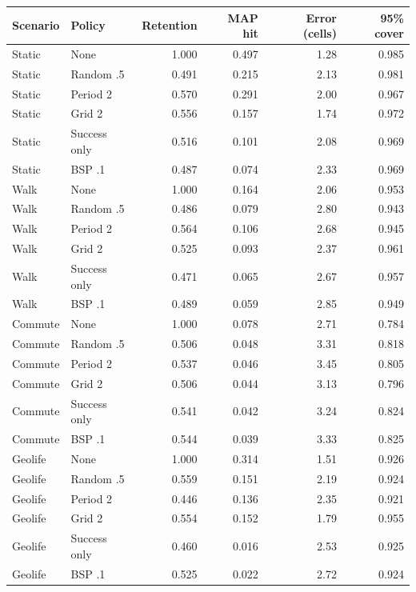 \begin{tabular}{llrrrr}
\toprule
Scenario & Policy & Retention & MAP hit & Error (cells) & 95\% cover \\
\midrule
Static & None & 1.000 & 0.497 & 1.28 & 0.985 \\
Static & Random .5 & 0.491 & 0.215 & 2.13 & 0.981 \\
Static & Period 2 & 0.570 & 0.291 & 2.00 & 0.967 \\
Static & Grid 2 & 0.556 & 0.157 & 1.74 & 0.972 \\
Static & Success only & 0.516 & 0.101 & 2.08 & 0.969 \\
Static & BSP .1 & 0.487 & 0.074 & 2.33 & 0.969 \\
\addlinespace
Walk & None & 1.000 & 0.164 & 2.06 & 0.953 \\
Walk & Random .5 & 0.486 & 0.079 & 2.80 & 0.943 \\
Walk & Period 2 & 0.564 & 0.106 & 2.68 & 0.945 \\
Walk & Grid 2 & 0.525 & 0.093 & 2.37 & 0.961 \\
Walk & Success only & 0.471 & 0.065 & 2.67 & 0.957 \\
Walk & BSP .1 & 0.489 & 0.059 & 2.85 & 0.949 \\
\addlinespace
Commute & None & 1.000 & 0.078 & 2.71 & 0.784 \\
Commute & Random .5 & 0.506 & 0.048 & 3.31 & 0.818 \\
Commute & Period 2 & 0.537 & 0.046 & 3.45 & 0.805 \\
Commute & Grid 2 & 0.506 & 0.044 & 3.13 & 0.796 \\
Commute & Success only & 0.541 & 0.042 & 3.24 & 0.824 \\
Commute & BSP .1 & 0.544 & 0.039 & 3.33 & 0.825 \\
\addlinespace
Geolife & None & 1.000 & 0.314 & 1.51 & 0.926 \\
Geolife & Random .5 & 0.559 & 0.151 & 2.19 & 0.924 \\
Geolife & Period 2 & 0.446 & 0.136 & 2.35 & 0.921 \\
Geolife & Grid 2 & 0.554 & 0.152 & 1.79 & 0.955 \\
Geolife & Success only & 0.460 & 0.016 & 2.53 & 0.925 \\
Geolife & BSP .1 & 0.525 & 0.022 & 2.72 & 0.924 \\
\bottomrule
\end{tabular}